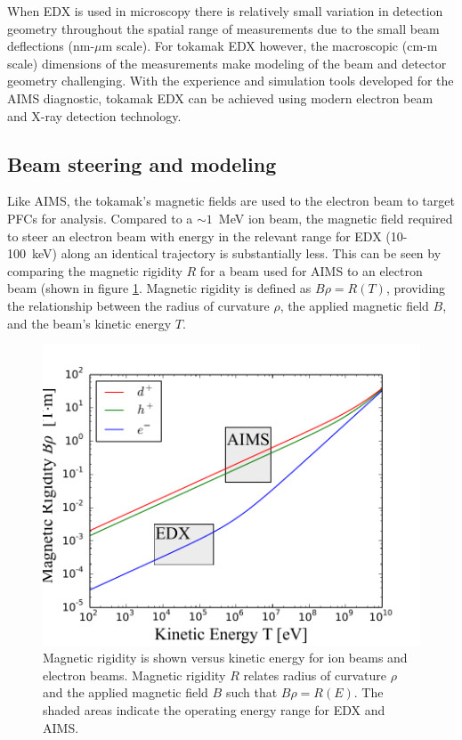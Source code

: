 \documentclass[12pt,letterpaper,final]{article}
\begin{document}
When EDX is used in microscopy there is relatively small variation in detection geometry throughout the spatial range of measurements due to the small beam deflections (nm-$\mu$m scale). For tokamak EDX however, the macroscopic (cm-m scale) dimensions of the measurements make modeling of the beam and detector geometry challenging. With the experience and simulation tools developed for the AIMS diagnostic, tokamak EDX can be achieved using modern electron beam and X-ray detection technology.

\subsection{Beam steering and modeling}
\label{sec:BeamSteering}
Like AIMS, the tokamak's magnetic fields are used to the electron beam to target PFCs for analysis. Compared to a $\sim 1$~MeV ion beam, the magnetic field required to steer an electron beam with energy in the relevant range for EDX (10-100~keV) along an identical trajectory is substantially less. This can be seen by comparing the magnetic rigidity $R$ for a beam used for AIMS to an electron beam (shown in figure \ref{fig:Rigidity}. Magnetic rigidity is defined as $B\rho = R(T)$, providing the relationship between the radius of curvature $\rho$, the applied magnetic field $B$, and the beam's kinetic energy $T$.

\begin{figure}[!h]
 \centering
  \includegraphics[width=\columnwidth]{figures/MagneticRigidity.pdf}
 \caption{Magnetic rigidity is shown versus kinetic energy for ion beams and electron beams. Magnetic rigidity $R$ relates radius of curvature $\rho$ and the applied magnetic field $B$ such that $B\rho = R(E)$. The shaded areas indicate the operating energy range for EDX and AIMS.}
 \label{fig:Rigidity}
\end{figure}
\end{document}
